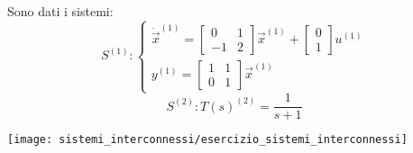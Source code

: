 \documentclass[../main.tex]{subfiles}
\begin{document}
			\begin{Exercise}[title={Studiare propriet\'a di sistemi interconnessi}, difficulty=3]
				Sono dati i sistemi:
				\[
					S^{(1)}:
					\begin{cases}
						\dot{\vec x}^{(1)} =
						\begin{bmatrix}
							0 & 1\\
							-1 & 2
						\end{bmatrix}
						\vec x^{(1)} +
						\begin{bmatrix}
							0\\
							1
						\end{bmatrix} u^{(1)}
						\\[.5cm]
						y^{(1)} =
						\begin{bmatrix}
							1 & 1\\
							0 & 1
						\end{bmatrix} \vec x^{(1)}
					\end{cases}
				\]
				\[
					S^{(2)}: T(s)^{(2)}=\dfrac{1}{s+1}
				\]
				
				\begin{center}
					\texttt{[image: sistemi\_interconnessi/esercizio\_sistemi\_interconnessi]}	
				\end{center}
				

\end{Exercise}
\end{document}
